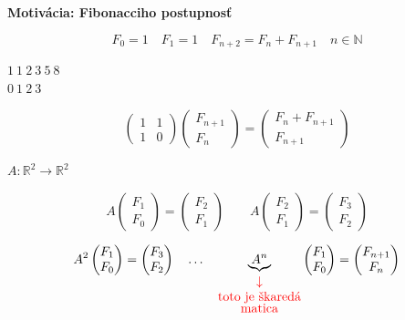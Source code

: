 \documentclass[11pt,a4paper]{article}
\theoremstyle{definition}
\theoremstyle{plain}
\theoremstyle{remark}
\newcommand{\Nat}{\mathbb{N}}
\newcommand{\R}{\mathbb{R}}
\begin{document}
\vspace{0.5cm}
\noindent \textbf{Motivácia: Fibonacciho postupnosť}

\begin{minipage}{0.65\textwidth}
\[ F_0 = 1 \quad F_1 = 1 \quad F_{n+2} = F_{n} + F_{n+1} \quad n \in \Nat \]
\end{minipage}
\begin{minipage}{0.3\textwidth}
\begin{center}
$1 \ 1 \ 2 \ 3 \ 5 \ 8$\\
\small $0 \ 1 \ 2 \ 3$
\end{center}
\end{minipage}

\[
\begin{pmatrix} 1 & 1 \\ 1 & 0 \end{pmatrix} 
\begin{pmatrix} F_{n+1} \\ F_n \end{pmatrix} 
= \begin{pmatrix} F_n + F_{n+1} \\ F_{n+1} \end{pmatrix}
\]

\vspace{0.3cm}
\noindent $A \colon \R^2 \to \R^2$

\[
A \begin{pmatrix} F_1 \\ F_0 \end{pmatrix} = \begin{pmatrix} F_2 \\ F_1 \end{pmatrix} \qquad 
A \begin{pmatrix} F_2 \\ F_1 \end{pmatrix} = \begin{pmatrix} F_3 \\ F_2 \end{pmatrix}
\]

\[
A^2 \begin{pmatrix} F_1 \\ F_0 \end{pmatrix} = \begin{pmatrix} F_3 \\ F_2 \end{pmatrix} \quad \dots \quad 
\underbrace{A^n}_{\color{red}\begin{matrix} \downarrow \\ \text{toto je škaredá} \\[-0.1cm] \text{matica} \end{matrix}} 
\begin{pmatrix} F_1 \\ F_0 \end{pmatrix} = \begin{pmatrix} F_{n+1} \\ F_n \end{pmatrix}
\]
\end{document}
